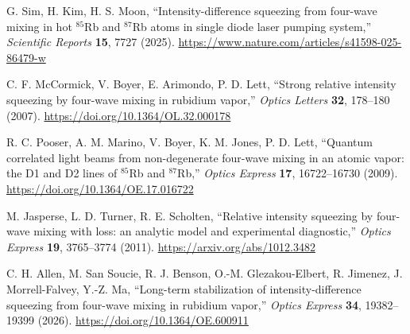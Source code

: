 \documentclass[11pt,a4paper]{article}
\begin{document}
\begin{enumerate}[label={[\arabic*]},leftmargin=*]
\item G. Sim, H. Kim, H. S. Moon, ``Intensity-difference squeezing from four-wave mixing
      in hot $^{85}$Rb and $^{87}$Rb atoms in single diode laser pumping system,''
      \textit{Scientific Reports} \textbf{15}, 7727 (2025).
      \url{https://www.nature.com/articles/s41598-025-86479-w}
\item C. F. McCormick, V. Boyer, E. Arimondo, P. D. Lett,
      ``Strong relative intensity squeezing by four-wave mixing in rubidium vapor,''
      \textit{Optics Letters} \textbf{32}, 178--180 (2007).
      \url{https://doi.org/10.1364/OL.32.000178}
\item R. C. Pooser, A. M. Marino, V. Boyer, K. M. Jones, P. D. Lett,
      ``Quantum correlated light beams from non-degenerate four-wave mixing in an atomic vapor:
      the D1 and D2 lines of $^{85}$Rb and $^{87}$Rb,''
      \textit{Optics Express} \textbf{17}, 16722--16730 (2009).
      \url{https://doi.org/10.1364/OE.17.016722}
\item M. Jasperse, L. D. Turner, R. E. Scholten,
      ``Relative intensity squeezing by four-wave mixing with loss: an analytic model and
      experimental diagnostic,'' \textit{Optics Express} \textbf{19}, 3765--3774 (2011).
      \url{https://arxiv.org/abs/1012.3482}
\item C. H. Allen, M. San Soucie, R. J. Benson, O.-M. Glezakou-Elbert, R. Jimenez,
      J. Morrell-Falvey, Y.-Z. Ma,
      ``Long-term stabilization of intensity-difference squeezing from four-wave mixing in
      rubidium vapor,'' \textit{Optics Express} \textbf{34}, 19382--19399 (2026).
      \url{https://doi.org/10.1364/OE.600911}
\end{enumerate}
\end{document}
